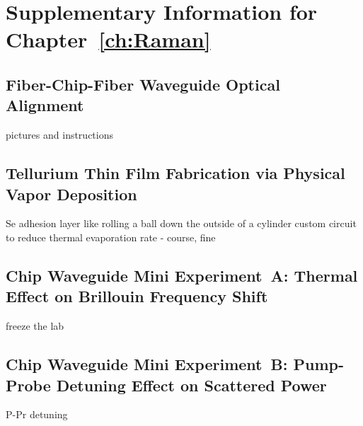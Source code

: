 \chapter{Supplementary Information for Chapter~\ref{ch:Raman}}
\label{appendix: Raman}
\acresetall

\section{Fiber-Chip-Fiber Waveguide Optical Alignment}
\label{Raman:Appendix:sec:WaveguideAlignment}

pictures and instructions

\section{Tellurium Thin Film Fabrication via Physical Vapor Deposition}
\label{Raman:Appendix:sec:TePVD}

Se adhesion layer
like rolling a ball down the outside of a cylinder
custom circuit to reduce thermal evaporation rate - course, fine

\section{Chip Waveguide Mini Experiment~A: Thermal Effect on Brillouin Frequency Shift}
\label{Raman:Appendix:sec:MiniExperimentAThermal}

freeze the lab

\section{Chip Waveguide Mini Experiment~B: Pump-Probe Detuning Effect on Scattered Power}
\label{Raman:Appendix:sec:MiniExperimentBDetuning}

P-Pr detuning
